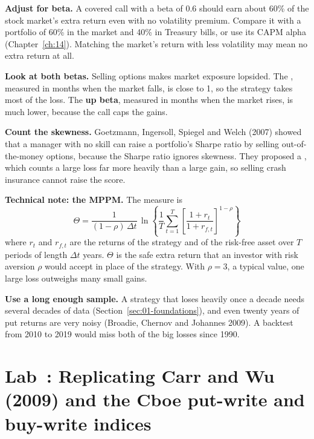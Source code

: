 \textbf{Adjust for beta.} A covered call with a beta of 0.6 should earn about 60\% of the stock market's extra return even with no volatility premium. Compare it with a portfolio of 60\% in the market and 40\% in Treasury bills, or use its CAPM alpha (Chapter~\ref{ch:14}). Matching the market's return with less volatility may mean no extra return at all.

\textbf{Look at both betas.} Selling options makes market exposure lopsided. The , measured in months when the market falls, is close to 1, so the strategy takes most of the loss. The \textbf{up beta}, measured in months when the market rises, is much lower, because the call caps the gains.

\textbf{Count the skewness.} Goetzmann, Ingersoll, Spiegel and Welch (2007) showed that a manager with no skill can raise a portfolio's Sharpe ratio by selling out-of-the-money options, because the Sharpe ratio ignores skewness. They proposed a , which counts a large loss far more heavily than a large gain, so selling crash insurance cannot raise the score.

\begin{technote}
\textbf{Technical note: the MPPM.} The measure is
\begin{equation}
  \Theta = \frac{1}{(1 - \rho)\,\Delta t}\,\ln\!\left\{\frac{1}{T}\sum_{t=1}^{T}\left[\frac{1 + r_t}{1 + r_{f,t}}\right]^{1-\rho}\right\}
  \label{eq:16-mppm}
\end{equation}
where $r_t$ and $r_{f,t}$ are the returns of the strategy and of the risk-free asset over $T$ periods of length $\Delta t$ years. $\Theta$ is the safe extra return that an investor with risk aversion $\rho$ would accept in place of the strategy. With $\rho = 3$, a typical value, one large loss outweighs many small gains.
\end{technote}

\textbf{Use a long enough sample.} A strategy that loses heavily once a decade needs several decades of data (Section~\ref{sec:01-foundations}), and even twenty years of put returns are very noisy (Broadie, Chernov and Johannes 2009). A backtest from 2010 to 2019 would miss both of the big losses since 1990.


\section{Lab~\thechapter: Replicating Carr and Wu (2009) and the Cboe put-write and buy-write indices}
\label{sec:16-lab}

